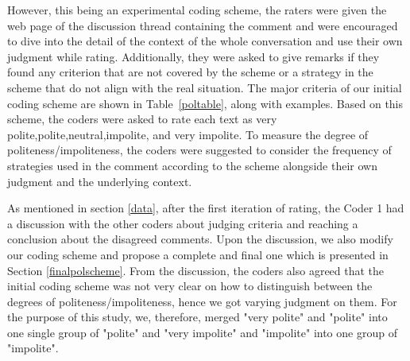 However, this being an experimental coding scheme, 
the raters were given the web page 
of the discussion thread containing the comment 
and were encouraged to dive 
into the detail of the context of the whole conversation 
and use their own judgment while rating. 
Additionally, they were asked to give remarks 
if they found any criterion 
that are not covered by the scheme 
or a strategy in the scheme that
do not align with the real situation. 
The major criteria of our initial coding scheme 
are shown in Table~\ref{poltable}, along with examples.
Based on this scheme, 
the coders were asked to rate each text as 
very polite,polite,neutral,impolite, and very impolite.
To measure the degree of politeness/impoliteness, 
the coders were suggested to consider 
the frequency of strategies used in the comment 
according to the scheme 
alongside their own judgment and the underlying context.

As mentioned in section \ref{data}, 
after the first iteration of rating, 
the Coder 1 had a discussion with the other coders 
about judging criteria 
and reaching a conclusion about the disagreed comments. 
Upon the discussion, 
we also modify our coding scheme and 
propose a complete and final one 
which is presented in Section \ref{finalpolscheme}. 
From the discussion, 
the coders also agreed that the initial coding scheme 
was not very clear on how to distinguish 
between the degrees of politeness/impoliteness, 
hence we got varying judgment on them. 
For the purpose of this study, 
we, therefore, merged 
"very polite" and "polite" into one single group of "polite" 
and "very impolite" and "impolite" into one group of "impolite".

